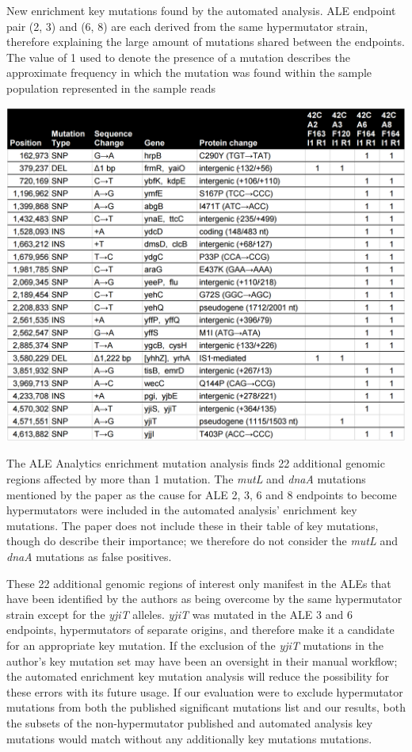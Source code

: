 \documentclass[12pt,final,masters,chapterheads]{ucsd}  %
\begin{document}
\begin{table}[H]
  \caption{New enrichment key mutations found by the automated analysis. ALE endpoint pair (2, 3) and (6, 8) are each derived from the same hypermutator strain, therefore explaining the large amount of mutations shared between the endpoints. The value of 1 used to denote the presence of a mutation describes the approximate frequency in which the mutation was found within the sample population represented in the sample reads \cite{breseq_paper}}
  \centering
  \includegraphics[width=\textwidth]{42c_new_enrich_muts.png}
\end{table}
The ALE Analytics enrichment mutation analysis finds 22 additional genomic regions affected by more than 1 mutation. The \textit{mutL} and \textit{dnaA} mutations mentioned by the paper as the cause for ALE 2, 3, 6 and 8 endpoints to become hypermutators were included in the automated analysis' enrichment key mutations. The paper does not include these in their table of key mutations, though do describe their importance; we therefore do not consider the \textit{mutL} and \textit{dnaA} mutations as false positives.

These 22 additional genomic regions of interest only manifest in the ALEs that have been identified by the authors as being overcome by the same hypermutator strain except for the \textit{yjiT} alleles. \textit{yjiT} was mutated in the ALE 3 and 6 endpoints, hypermutators of separate origins, and therefore make it a candidate for an appropriate key mutation. If the exclusion of the \textit{yjiT} mutations in the author's key mutation set may have been an oversight in their manual workflow; the automated enrichment key mutation analysis will reduce the possibility for these errors with its future usage. If our evaluation were to exclude hypermutator mutations from both the published significant mutations list and our results, both the subsets of the non-hypermutator published and automated analysis key mutations would match without any additionally key mutations mutations. 
\end{document}
